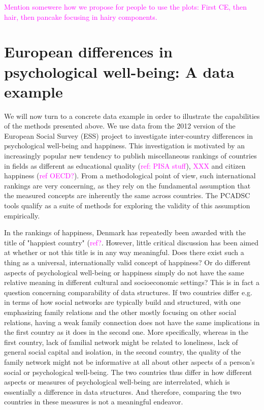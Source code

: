 \documentclass[titlepage,11pt,twoside]{article}
\newcommand{\hl}[1]{\textcolor{magenta}{#1}}
\begin{document}
\hl{Mention somewere how we propose for people to use the plots: First CE, then hair, then pancake focusing in hairy components.}



\section{European differences in psychological well-being: A data example}
\label{sec:dataexample}
We will now turn to a concrete data example in order to illustrate the capabilities of the methods presented above. We use data from the 2012 version of the European Social Survey (ESS) project to investigate inter-country differences in psychological well-being and happiness. This investigation is motivated by an increasingly popular new tendency to publish miscellaneous rankings of countries in fields as different as educational quality (\hl{ref: PISA stuff}), \hl{XXX} and citizen happiness (\hl{ref OECD?}). From a methodological point of view, such international rankings are very concerning, as they rely on the fundamental assumption  that the measured concepts are inherently the same across countries. The PCADSC tools qualify as a suite of methods for exploring the validity of this assumption empirically. 

In the rankings of happiness, Denmark has repeatedly been awarded with the title of "happiest country" (\hl{ref?}. However, little critical discussion has been aimed at whether or not this title is in any way meaningful. Does there exist such a thing as a universal, internationally valid concept of happiness? Or do different aspects of psychological well-being or happiness simply do not have the same relative meaning in different cultural and socioeconomic settings? This is in fact a question concerning comparability of data structures. If two countries differ e.g. in terms of how social networks are typically build and structured, with one emphasizing family relations and the other mostly focusing on other social relations, having a weak family connection does not have the same implications in the first country as it does in the second one. More specifically, whereas in the first country, lack of familial network might be related to loneliness, lack of general social capital and isolation, in the second country, the quality of the family network might not be informative at all about other aspects of a person's social or psychological well-being. The two countries thus differ in how different aspects or measures of psychological well-being are interrelated, which is essentially a difference in data structures. And therefore, comparing the two countries in these measures is not a meaningful endeavor. 
\end{document}
